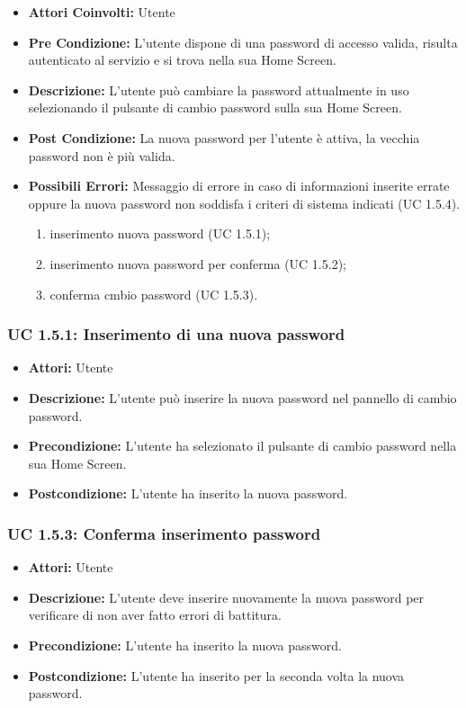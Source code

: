 \begin{itemize}
\item \textbf{Attori Coinvolti:} Utente
\item \textbf{Pre Condizione:} L'utente dispone di una password di accesso valida, risulta autenticato al servizio e si trova nella sua Home Screen.
\item \textbf{Descrizione:} L'utente può cambiare la password attualmente in uso selezionando il pulsante di cambio password sulla sua Home Screen.
\item \textbf{Post Condizione:} La nuova password per l'utente è attiva, la vecchia password non è più valida.
\item \textbf{Possibili Errori:} Messaggio di errore in caso di informazioni inserite errate oppure la nuova password non soddisfa i criteri di sistema indicati (UC 1.5.4).

\begin{enumerate}
\item inserimento nuova password (UC 1.5.1);
\item inserimento nuova password per conferma (UC 1.5.2);
\item conferma cmbio password (UC 1.5.3).
\end{enumerate}

\end{itemize}

\subsubsection{UC 1.5.1: Inserimento di una nuova password}

\begin{itemize}
\item \textbf{Attori:} Utente
\item \textbf{Descrizione:} L'utente può inserire la nuova password nel pannello di cambio password.
\item \textbf{Precondizione:} L'utente ha selezionato il pulsante di cambio password nella sua Home Screen.
\item \textbf{Postcondizione:} L'utente ha inserito la nuova password.
\end{itemize}

\subsubsection{UC 1.5.3: Conferma inserimento password }

\begin{itemize}
\item \textbf{Attori:} Utente
\item \textbf{Descrizione:} L'utente deve inserire nuovamente la nuova password per verificare di non aver fatto errori di battitura.
\item \textbf{Precondizione:} L'utente ha inserito la nuova password.
\item \textbf{Postcondizione:} L'utente ha inserito per la seconda volta la nuova password.
\end{itemize}

